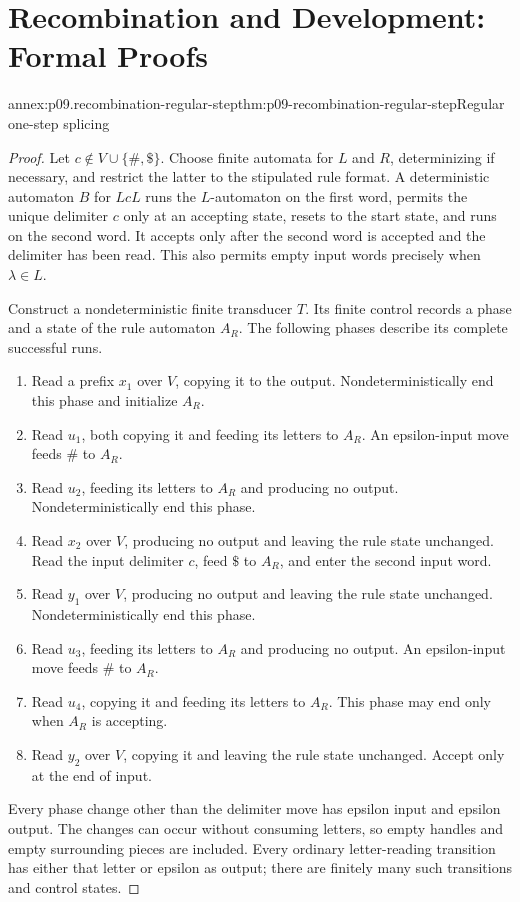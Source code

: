 \section{Recombination and Development: Formal Proofs}
\label{annex:p09-recombination-development}

\begin{annexitem}{annex:p09.recombination-regular-step}{thm:p09-recombination-regular-step}{Regular one-step splicing}
\begin{proof}
Let \(c\notin V\cup\{\#,\$\}\). Choose finite automata for \(L\) and
\(R\), determinizing if necessary, and restrict the latter to the stipulated
rule format. A deterministic automaton \(B\) for \(LcL\) runs the
\(L\)-automaton on the first word, permits the unique delimiter \(c\) only
at an accepting state, resets to the start state, and runs on the second
word. It accepts only after the second word is accepted and the delimiter
has been read. This also permits empty input words precisely when
\(\lambda\in L\).

Construct a nondeterministic finite transducer \(T\). Its finite control
records a phase and a state of the rule automaton \(A_R\).
The following phases describe its complete successful runs.
\begin{enumerate}
\item Read a prefix \(x_1\) over \(V\), copying it to the output.
       Nondeterministically end this phase and initialize \(A_R\).
\item Read \(u_1\), both copying it and feeding its letters to \(A_R\).
       An epsilon-input move feeds \(\#\) to \(A_R\).
\item Read \(u_2\), feeding its letters to \(A_R\) and producing no output.
       Nondeterministically end this phase.
\item Read \(x_2\) over \(V\), producing no output and leaving the rule
       state unchanged. Read the input delimiter \(c\), feed \(\$\)
       to \(A_R\), and enter the second input word.
\item Read \(y_1\) over \(V\), producing no output and leaving the rule
       state unchanged. Nondeterministically end this phase.
\item Read \(u_3\), feeding its letters to \(A_R\) and producing no output.
       An epsilon-input move feeds \(\#\) to \(A_R\).
\item Read \(u_4\), copying it and feeding its letters to \(A_R\).
       This phase may end only when \(A_R\) is accepting.
\item Read \(y_2\) over \(V\), copying it and leaving the rule state
       unchanged. Accept only at the end of input.
\end{enumerate}
Every phase change other than the delimiter move has epsilon input and
epsilon output. The changes can occur without consuming letters, so
empty handles and empty surrounding pieces are included. Every ordinary
letter-reading transition has either that letter or epsilon as output;
there are finitely many such transitions and control states.


\end{proof}
\end{annexitem}
